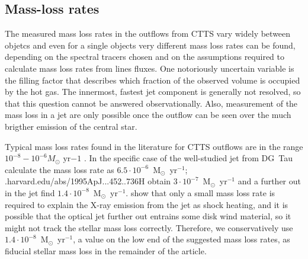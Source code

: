 \subsection{Mass-loss rates}
The measured mass loss rates in the outflows from CTTS vary widely between objetcs and even for a single objects very different mass loss rates can be found, depending on the spectral tracers chosen and on the assumptions required to calculate mass loss rates from lines fluxes. One notoriously uncertain variable is the filling factor that describes which fraction of the observed volume is occupied by the hot gas. The innermost, fastest jet component is generally not resolved, so that this question cannot be answered observationally. Also, measurement of the mass loss in a jet are only possible once the outflow can be seen over the much brigther emission of the central star. 

Typical mass loss rates found in the literature for CTTS outflows are in the range $10^{-8}-10^{-6}M_{\odot}\textrm{ yr}{-1}$ \citep{adsabs.harvard.edu/abs/1999A&A...342..717B,adsabs.harvard.edu/abs/2006A&A...456..189P}. In the specific case of the well-studied jet from DG~Tau \citet{adsabs.harvard.edu/abs/1997A&A...327..671L} calculate the  mass loss rate as $6.5\cdot 10^{-6}$~M$_{\odot}$~yr$^{-1}$; \citetadsabs.harvard.edu/abs/{1995ApJ...452..736H}
obtain $3\cdot 10^{-7}$~M$_{\odot}$~yr$^{-1}$ and a further out in the jet \citet{adsabs.harvard.edu/abs/2000A&A...356L..41L} find $1.4\cdot 10^{-8}$~M$_{\odot}$~yr$^{-1}$. 
\citet{adsabs.harvard.edu/abs/2009A&A...493..579G} show that only a small mass loss rate is required to explain the X-ray emission from the jet as shock heating, and it is possible that the optical jet further out entrains some disk wind material, so it might not track the stellar mass loss correctly.
Therefore, we conservatively use $1.4\cdot 10^{-8}$~M$_{\odot}$~yr$^{-1}$, a value on the low end of the suggested mass loss rates, as fiducial stellar mass loss in the remainder of the article.